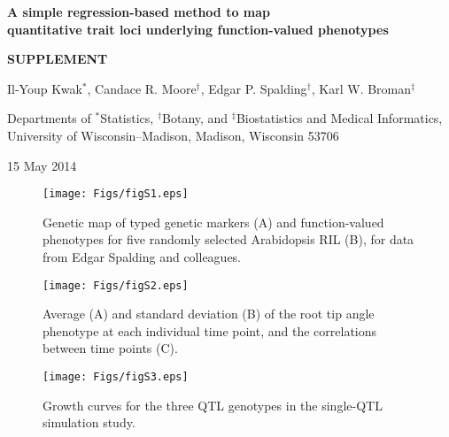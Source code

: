 \documentclass[letterpaper,twoside]{article}
\begin{document}
\vspace*{8mm}
\begin{center}

\textbf{\Large A simple regression-based method to map \\[6pt]
  quantitative trait loci underlying function-valued
  phenotypes}

\bigskip \bigskip \bigskip \bigskip

\textbf{\Large SUPPLEMENT}

\bigskip \bigskip
\bigskip \bigskip


{\large Il-Youp Kwak$^*$, Candace R. Moore$^\dagger$, Edgar
  P. Spalding$^\dagger$, Karl W. Broman$^{\ddagger}$}

\bigskip \bigskip

Departments of $^*$Statistics, $^\dagger$Botany, and $^\ddagger$Biostatistics and Medical
Informatics, \\
University of Wisconsin--Madison, Madison, Wisconsin 53706
\end{center}


\vfill

\hfill
{\footnotesize 15 May 2014}


\clearpage

\begin{figure}[p]
\centerline{\texttt{[image: Figs/figS1.eps]}}

\caption{Genetic map of typed genetic markers (A)
     and function-valued phenotypes for five randomly selected
     Arabidopsis RIL (B), for data from Edgar Spalding and colleagues.}
\end{figure}

\clearpage

\begin{figure}[p]
\centerline{\texttt{[image: Figs/figS2.eps]}}
\vspace{1cm}

\caption{Average (A) and standard deviation (B) of the root tip angle phenotype at
  each individual time point, and the correlations between time points (C).}
\end{figure}

\clearpage

\begin{figure}[!ht]
\begin{center}
\texttt{[image: Figs/figS3.eps]}
\vspace{1cm}
 \caption{Growth curves for the three QTL genotypes in the single-QTL
   simulation study.}
\end{center}
\end{figure}
\end{document}
